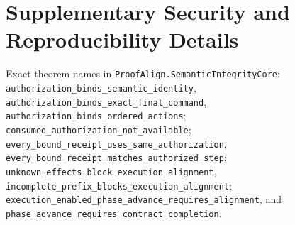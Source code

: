 \section{Supplementary Security and Reproducibility Details}
\label{app:lean}

\begingroup
\scriptsize\sloppy
Exact theorem names in \texttt{ProofAlign.SemanticIntegrityCore}:
\nolinkurl{authorization_binds_semantic_identity},
\nolinkurl{authorization_binds_exact_final_command},
\nolinkurl{authorization_binds_ordered_actions};
\nolinkurl{consumed_authorization_not_available};
\nolinkurl{every_bound_receipt_uses_same_authorization},
\nolinkurl{every_bound_receipt_matches_authorized_step};
\nolinkurl{unknown_effects_block_execution_alignment},
\nolinkurl{incomplete_prefix_blocks_execution_alignment};
\nolinkurl{execution_enabled_phase_advance_requires_alignment}, and
\nolinkurl{phase_advance_requires_contract_completion}.
\endgroup
